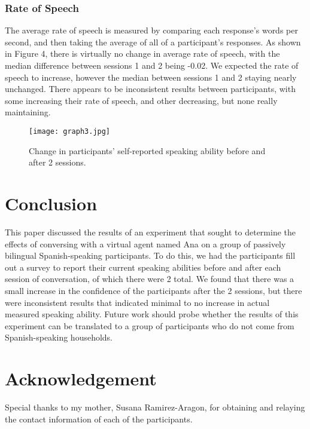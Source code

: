 \documentclass{vgtc}                          %
\begin{document}
\subsubsection{Rate of Speech}
The average rate of speech is measured by comparing each response's words per second, and then taking the average of all of a participant's responses.
As shown in Figure 4, there is virtually no change in average rate of speech, with the median difference between sessions 1 and 2 being -0.02.
We expected the rate of speech to increase, however the median between sessions 1 and 2 staying nearly unchanged.
There appears to be inconsistent results between participants, with some increasing their rate of speech, and other decreasing, but none really maintaining.
\begin{figure}[htp]
    \centering
    \texttt{[image: graph3.jpg]}
    \caption{Change in participants' self-reported speaking ability before and after 2 sessions.}
    \label{fig:graph3}
\end{figure}


\section{Conclusion}
This paper discussed the results of an experiment that sought to determine the effects of conversing with a virtual agent named Ana on a group of passively bilingual Spanish-speaking participants.
To do this, we had the participants fill out a survey to report their current speaking abilities before and after each session of conversation, of which there were 2 total.
We found that there was a small increase in the confidence of the participants after the 2 sessions, but there were inconsistent results that indicated minimal to no increase in actual measured speaking ability.
Future work should probe whether the results of this experiment can be translated to a group of participants who do not come from Spanish-speaking households.

\section{Acknowledgement}
Special thanks to my mother, Susana Ramirez-Aragon, for obtaining and relaying the contact information of each of the participants.

%

%
%
%


\end{document}
